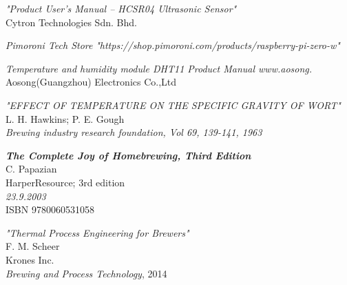 \documentclass[twoside]{ctuthesis}
\theoremstyle{plain}
\theoremstyle{definition}
\theoremstyle{note}
\begin{document}
\begin{thebibliography}{9}
	\textit{"Product User’s Manual – HCSR04 Ultrasonic Sensor"}\\
	Cytron Technologies Sdn. Bhd.
	
	\textit{Pimoroni Tech Store}
	\textit{"https://shop.pimoroni.com/products/raspberry-pi-zero-w"}
	
	\textit{Temperature and humidity module DHT11 Product Manual
		www.aosong.}\\
	Aosong(Guangzhou) Electronics Co.,Ltd
	
	\textit{"EFFECT OF TEMPERATURE ON THE SPECIFIC GRAVITY OF WORT"}\\
	L. H. Hawkins; P. E. Gough\\
	\textit{Brewing industry research foundation, Vol 69, 139-141, 1963}
	
	\textit{\textbf{The Complete Joy of Homebrewing, Third Edition}}\\
	C. Papazian\\
	HarperResource; 3rd edition\\
	\textit{23.9.2003}\\
	ISBN 9780060531058
	
	\textit{"Thermal Process Engineering for Brewers"}\\
	F. M. Scheer\\
	Krones Inc.\\
	\textit{Brewing and Process Technology}, 2014
	
	
	
\end{thebibliography}

\end{document}
